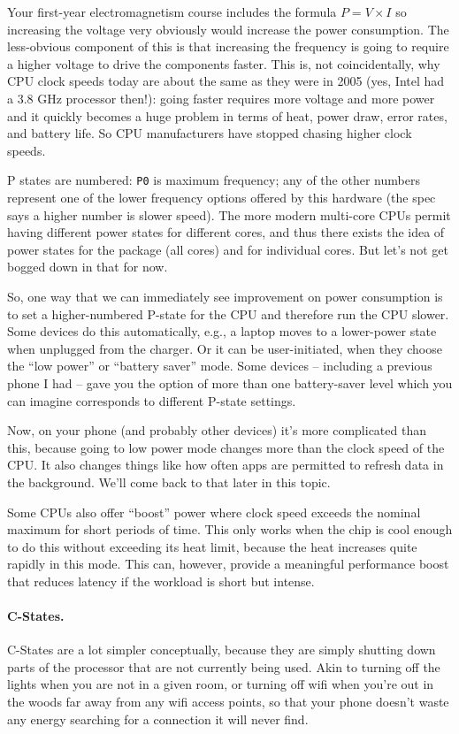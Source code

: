 Your first-year electromagnetism course includes the formula $P = V\times I$ so increasing the voltage very obviously would increase the power consumption. The less-obvious component of this is that increasing the frequency is going to require a higher voltage to drive the components faster. This is, not coincidentally, why CPU clock speeds today are about the same as they were in 2005 (yes, Intel had a 3.8 GHz processor then!): going faster requires more voltage and more power and it quickly becomes a huge problem in terms of heat, power draw, error rates, and battery life. So CPU manufacturers have stopped chasing higher clock speeds.

P states are numbered: \texttt{P0} is maximum frequency; any of the other numbers represent one of the lower frequency options offered by this hardware (the spec says a higher number is slower speed). The more modern multi-core CPUs permit having different power states for different cores, and thus there exists the idea of power states for the package (all cores) and for individual cores. But let's not get bogged down in that for now.

So, one way that we can immediately see improvement on power consumption is to set a higher-numbered P-state for the CPU and therefore run the CPU slower. Some devices do this automatically, e.g., a laptop moves to a lower-power state when unplugged from the charger. Or it can be user-initiated, when they choose the ``low power'' or ``battery saver'' mode. Some devices -- including a previous phone I had -- gave you the option of more than one battery-saver level which you can imagine corresponds to different P-state settings.

Now, on your phone (and probably other devices) it's more complicated than this, because going to low power mode changes more than the clock speed of the CPU. It also changes things like how often apps are permitted to refresh data in the background. We'll come back to that later in this topic.

Some CPUs also offer ``boost'' power where clock speed exceeds the nominal maximum for short periods of time. This only works when the chip is cool enough to do this without exceeding its heat limit, because the heat increases quite rapidly in this mode. This can, however, provide a meaningful performance boost that reduces latency if the workload is short but intense.

\paragraph{C-States.} C-States are a lot simpler conceptually, because they are simply shutting down parts of the processor that are not currently being used. Akin to turning off the lights when you are not in a given room, or turning off wifi when you're out in the woods far away from any wifi access points, so that your phone doesn't waste any energy searching for a connection it will never find.

